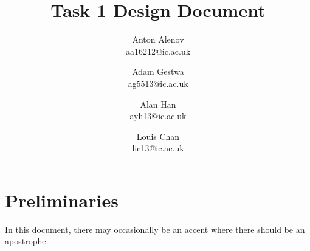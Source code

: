 \documentclass[11pt]{article}
\begin{document}
\title{Task 1 Design Document}
\author{Anton Alenov\\aa16212@ic.ac.uk \and Adam Gestwa\\ag5513@ic.ac.uk \and Alan Han\\ayh13@ic.ac.uk \and Louis Chan\\lic13@ic.ac.uk}

\maketitle

\section{Preliminaries}
In this document, there may occasionally be an accent where there should be an apostrophe.


\newpage

\end{document}
